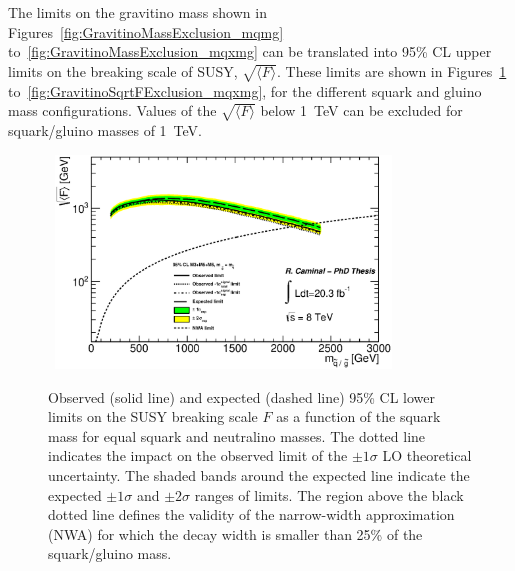 The limits on the gravitino mass shown in Figures~\ref{fig:GravitinoMassExclusion_mqmg} to~\ref{fig:GravitinoMassExclusion_mqxmg} can be translated into 95\% CL upper limits on the breaking scale of SUSY, $\sqrt{\langle F \rangle}$.
These limits are shown in Figures~\ref{fig:GravitinoSqrtFExclusion_mqmg} to~\ref{fig:GravitinoSqrtFExclusion_mqxmg}, for the different squark and gluino mass configurations.
Values of the $\sqrt{\langle F \rangle}$ below 1~TeV can be excluded for squark/gluino masses of 1~TeV.

\begin{figure}[!ht]
\begin{center}
\mbox{
\includegraphics[width=0.795\textwidth]{Interpretations/Figures/ModelIndependentGravitino_combined_sqrtFLimit_Stop_A4_A9_A10.eps}
}
\end{center}
\caption[95\% CL lower limits on the SUSY breaking scale $F$ as a function of the squark mass for equal squark and neutralino masses.]{Observed (solid line) and expected (dashed line) 95\% CL lower limits on the SUSY breaking scale $F$ as a function of the squark mass for equal squark and neutralino masses. The dotted line indicates the impact on the observed limit of the $\pm1\sigma$ LO theoretical uncertainty. The shaded bands around the expected line indicate the expected $\pm1\sigma$ and $\pm2\sigma$ ranges of limits. 
  The region above the black dotted line defines the validity of the narrow-width approximation (NWA) for which the decay width is smaller than 25\% of the squark/gluino mass.}
\label{fig:GravitinoSqrtFExclusion_mqmg}
\end{figure}

